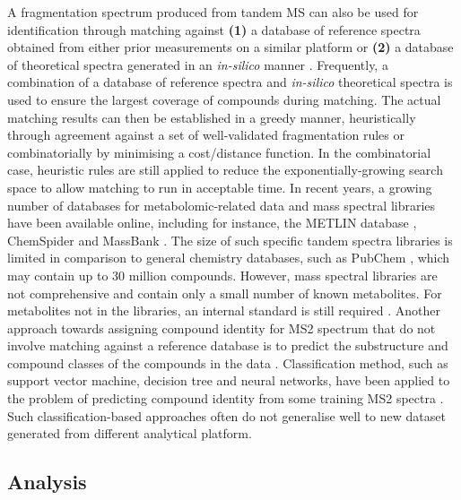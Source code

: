 A fragmentation spectrum produced from tandem MS can also be used for identification through matching against \textbf{(1)} a database of reference spectra obtained from either prior measurements on a similar platform or \textbf{(2)} a database of theoretical spectra generated in an \textit{in-silico} manner \cite{Hufsky2014}. Frequently, a combination of a database of reference spectra and \textit{in-silico} theoretical spectra is used to ensure the largest coverage of compounds during matching. The actual matching results can then be established in a greedy manner, heuristically through agreement against a set of well-validated fragmentation rules or combinatorially by minimising a cost/distance function. In the combinatorial case, heuristic rules are still applied to reduce the exponentially-growing search space to allow matching to run in acceptable time. In recent years, a growing number of databases for metabolomic-related data and mass spectral libraries have been available online, including for instance, the METLIN database \cite{Smith2005}, ChemSpider \cite{pence2010chemspider} and MassBank \cite{horai2010massbank}. The size of such specific tandem spectra libraries is limited in comparison to general chemistry databases, such as PubChem \cite{wang2009pubchem}, which may contain up to 30 million compounds. However, mass spectral libraries are not comprehensive and contain only a small number of known metabolites. For metabolites not in the libraries, an internal standard is still required \cite{Dunn2012}. Another approach towards assigning compound identity for MS2 spectrum that do not involve matching against a reference database is to predict the substructure and compound classes of the compounds in the data \cite{Hufsky2014}. Classification method, such as support vector machine, decision tree and neural networks, have been applied to the problem of predicting compound identity from some training MS2 spectra \cite{Varmuza1996,Hummel2010,Heinonen2012}. Such classification-based approaches often do not generalise well to new dataset generated from different analytical platform.

\subsection{Analysis}


